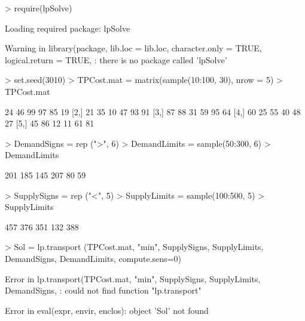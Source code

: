 \begin{Schunk}
\begin{Sinput}
> require(lpSolve)
\end{Sinput}
\begin{Soutput}
Loading required package: lpSolve
\end{Soutput}
\begin{Soutput}
Warning in library(package, lib.loc = lib.loc, character.only = TRUE, logical.return = TRUE, : there is no package called 'lpSolve'
\end{Soutput}
\begin{Sinput}
> set.seed(3010)
> TPCost.mat = matrix(sample(10:100, 30), nrow = 5)
> TPCost.mat
\end{Sinput}
\begin{Soutput}
     [,1] [,2] [,3] [,4] [,5] [,6]
[1,]   24   46   99   97   85   19
[2,]   21   35   10   47   93   91
[3,]   87   88   31   59   95   64
[4,]   60   25   55   40   48   27
[5,]   45   86   12   11   61   81
\end{Soutput}
\begin{Sinput}
> DemandSigns = rep (">", 6)
> DemandLimits = sample(50:300, 6)
> DemandLimits
\end{Sinput}
\begin{Soutput}
[1] 201 185 145 207  80  59
\end{Soutput}
\begin{Sinput}
> SupplySigns = rep ("<", 5)
> SupplyLimits = sample(100:500, 5)
> SupplyLimits
\end{Sinput}
\begin{Soutput}
[1] 457 376 351 132 388
\end{Soutput}
\begin{Sinput}
> Sol = lp.transport (TPCost.mat, "min", SupplySigns, SupplyLimits, DemandSigns, DemandLimits, compute.sens=0)
\end{Sinput}
\begin{Soutput}
Error in lp.transport(TPCost.mat, "min", SupplySigns, SupplyLimits, DemandSigns, : could not find function "lp.transport"
\end{Soutput}
\begin{Soutput}
Error in eval(expr, envir, enclos): object 'Sol' not found
\end{Soutput}
\end{Schunk}

